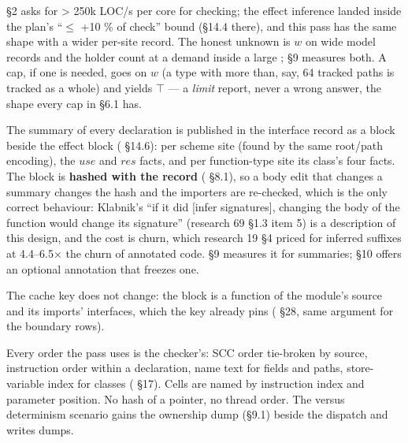  §2 asks for > 250k LOC/s per core for checking; the effect inference landed inside the plan's “$\le$ +10 \% of check” bound (§14.4 there), and this pass has the same shape with a wider per-site record. The honest unknown is $w$ on wide model records and the holder count at a demand inside a large ; §9 measures both. A cap, if one is needed, goes on $w$ (a type with more than, say, 64 tracked paths is tracked as a whole) and yields $\top$ — a \emph{limit} report, never a wrong answer, the shape every cap in  §6.1 has.


The summary of every  declaration is published in the interface record as a block beside the effect block ( §14.6): per scheme site (found by the same root/path encoding), the $\mathit{use}$ and $\mathit{res}$ facts, and per function-type site its class's four facts. The block is \textbf{hashed with the record} ( §8.1), so a body edit that changes a summary changes the hash and the importers are re-checked, which is the only correct behaviour: Klabnik's “if it did [infer signatures], changing the body of the function would change its signature” (research 69 §1.3 item 5) is a description of this design, and the cost is churn, which research 19 §4 priced for inferred  suffixes at 4.4–6.5× the churn of annotated code. §9 measures it for summaries; §10 offers an optional annotation that freezes one.

The cache key does not change: the block is a function of the module's source and its imports' interfaces, which the key already pins ( §28, same argument for the boundary rows).


Every order the pass uses is the checker's: SCC order tie-broken by source, instruction order within a declaration, name text for fields and paths, store-variable index for classes ( §17). Cells are named by instruction index and parameter position. No hash of a pointer, no thread order. The  versus  determinism scenario gains the ownership dump (§9.1) beside the dispatch and writes dumps.


